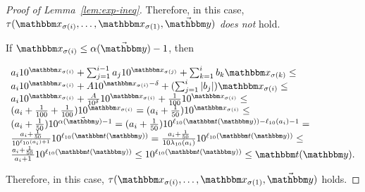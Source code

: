 \begin{proof}[Proof of Lemma~\ref{lem:exp-ineq}]
Therefore, in this case, $\tau(\ivarx_{\sigma(i)}, \ldots, \ivarx_{\sigma(1)}, \vec{\ivary})$ \emph{does not} hold.

If $\ivarx_{\sigma(i)} \le   \alpha(\vec{\ivary}) - 1$, then 

$
\begin{array}{l}
a_i 10^{\ivarx_{\sigma(i)}}+\sum_{j=1}^{i-1} a_j 10^{\ivarx_{\sigma(j)}} + \sum_{k=1}^{i}b_k \ivarx_{\sigma(k)} \le \\
a_i 10^{\ivarx_{\sigma(i)}} + A 10^{\ivarx_{\sigma(i)} - \delta} + (\sum_{j=1}^{i}|b_j|) \ivarx_{\sigma(i)} \le \\
a_i 10^{\ivarx_{\sigma(i)}} + \frac{A} {10^\delta}10^{\ivarx_{\sigma(i)}} + \frac{1}{100} 10^{\ivarx_{\sigma(i)}} \le \\
(a_i + \frac{1}{100} + \frac{1}{100})10^{\ivarx_{\sigma(i)}} = (a_i + \frac{1}{50}) 10^{\ivarx_{\sigma(i)}} \le \\
(a_i + \frac{1}{50}) 10^{\alpha(\vec{\ivary}) - 1} = (a_i + \frac{1}{50}) 10^{\ell_{10}(\iterm(\ivary))- \ell_{10}(a_i) - 1} = \\
\frac{a_i + \frac{1}{50}} {10^{\ell_{10}(a_i) + 1}} 10^{\ell_{10}(\iterm(\ivary))} = \frac{a_i + \frac{1}{50}} {10 \lambda_{10}(a_i)} 10^{\ell_{10}(\iterm(\ivary))} \le \\
\frac{a_i + \frac{1}{50}} {a_i+1} 10^{\ell_{10}(\iterm(\ivary))} \le 10^{\ell_{10}(\iterm(\ivary))} \le \iterm(\ivary).
\end{array}
$

Therefore,  in this case, $\tau(\ivarx_{\sigma(i)}, \ldots, \ivarx_{\sigma(1)}, \vec{\ivary})$ holds.



\end{proof}
